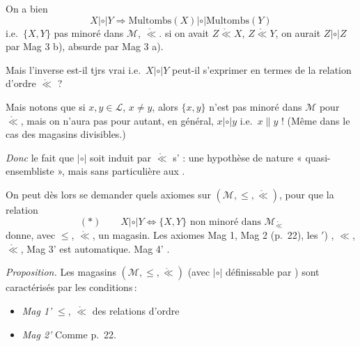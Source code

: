 \documentclass[11pt,a4paper]{article}
\begin{document}
 On a bien
\[
  X \mathrel{|\circ|} Y \Longrightarrow \mathrm{Multombs}(X) \mathrel{|\circ|}
  \mathrm{Multombs}(Y)
\]
i.e.\ $\{X, Y\}$ pas minoré dans $\mathcal{M}$, $\mathring{\ll}$. 
si on avait $Z \mathrel{\mathring{\ll}} X$, $Z \mathrel{\mathring{\ll}} Y$, on
aurait $Z \mathrel{|\circ|} Z$ par Mag 3 b), absurde par Mag 3 a).

Mais l'inverse est-il tjrs vrai i.e.\ $X \mathrel{|\circ|} Y$ peut-il s'exprimer en
termes de la relation d'ordre $\mathring{\ll}$ ?

Mais notons que si $x, y \in \mathcal{L}$, $x \neq y$, alors $\{x, y\}$ n'est pas
minoré dans $\mathcal{M}$ pour $\mathring{\ll}$, mais on n'aura pas pour autant,
en général, $x \mathrel{|\circ|} y$ i.e.\ $x \| y$ ! (Même dans le cas des
magasins divisibles.)

\emph{Donc} le fait que $|\circ|$ soit induit par $\mathring{\ll}$ s' :
une hypothèse de nature « quasi-ensembliste », mais sans 
particulière aux .

On peut dès lors se demander quels axiomes  sur
$(\mathcal{M}, \leq, \mathring{\ll})$, pour que la relation
\[
  (*) \qquad X \mathrel{|\circ|} Y \Longleftrightarrow \{X, Y\}
  \text{ non minoré dans } \mathcal{M}_{\mathring{\ll}}
\]
donne, avec $\leq$, $\mathring{\ll}$, un magasin. Les axiomes Mag 1, Mag 2
(p.~22),     les ${}'$)
 ,  
$\ll$, $\mathring{\ll}$,  Mag 3' est automatique.
Mag 4' .


\emph{Proposition.} Les magasins $(\mathcal{M}, \leq, \mathring{\ll})$ (avec
$|\circ|$ définissable par \struck{\ill{}} ) sont
caractérisés par les conditions\,:
\begin{itemize}
  \item[] \emph{Mag 1'} $\leq$, $\mathring{\ll}$ des relations d'ordre
  \item[] \emph{Mag 2'} Comme    p.~22.
\end{itemize}
\end{document}
